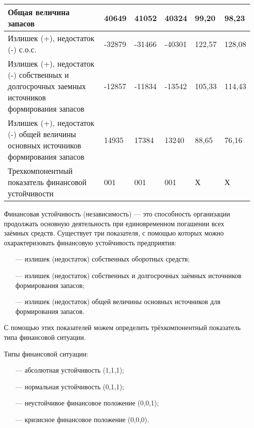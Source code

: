 \begin{table}[!hb]
\begin{tabularx}{\textwidth}{|p{4.7cm}|K{1.7cm}|K{1.7cm}|K{1.7cm}|K{2.2cm}|K{2.2cm}|}
		Общая величина запасов                                                                         & 40649                          & 41052                          & 40324                          & 99,20                 & 98,23                 \\ \hline
		Излишек (+), недостаток (-) с.о.с.                                                             & -32879                         & -31466                         & -40301                         & 122,57                & 128,08                \\ \hline
		Излишек (+), недостаток (-) собственных и долгосрочных заемных источников формирования запасов & -12857                         & -11834                         & -13542                         & 105,33                & 114,43                \\ \hline
		Излишек (+), недостаток (-) общей величины основных источников формирования запасов            & 14935                          & 17384                          & 13240                          & 88,65                 & 76,16                 \\ \hline
		Трехкомпонентный показатель финансовой  устойчивости                                           & 001                            & 001                            & 001                            & Х                     & Х                     \\ \hline
	\end{tabularx}
\end{table}

Финансовая устойчивость (независимость) --- это способность организации продолжать основную деятельность при единовременном погашении всех заёмных средств. Существует три показателя,  с помощью которых можно охарактеризовать финансовую устойчивость предприятия:
\begin{enumerate}
	\item [---] излишек (недостаток) собственных оборотных средств;
	\item [---] излишек (недостаток) собственных и долгосрочных заёмных источников формирования запасов;
	\item [---] излишек (недостаток) общей величины основных источников для формирования запасов.
\end{enumerate}

С помощью этих показателей можем определить трёхкомпонентный показатель типа финансовой ситуации.

Типы финансовой ситуации:
\begin{enumerate}
\item [---] абсолютная устойчивость (1,1,1);
\item [---] нормальная устойчивость (0,1,1);
\item [---] неустойчивое финансовое положение (0,0,1);
\item [---] кризисное финансовое положение (0,0,0).
\end{enumerate}

